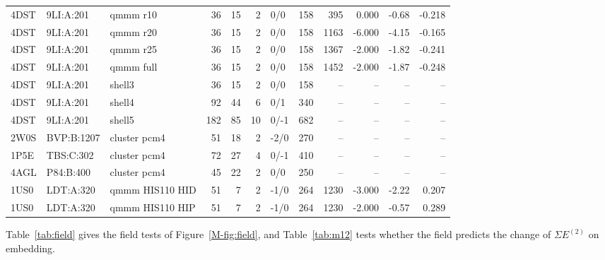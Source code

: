 \documentclass[journal=jcisd8,manuscript=suppinfo]{achemso}
\newcommand{\ET}{E^{(2)}}
\begin{document}
\begin{singlespace}
{\begin{longtable}{lllrrrlrrrrr}
4DST & 9LI:A:201 & qmmm r10 & 36 & 15 & 2 & 0/0 & 158 & 395 & 0.000 & -0.68 & -0.218\\
4DST & 9LI:A:201 & qmmm r20 & 36 & 15 & 2 & 0/0 & 158 & 1163 & -6.000 & -4.15 & -0.165\\
4DST & 9LI:A:201 & qmmm r25 & 36 & 15 & 2 & 0/0 & 158 & 1367 & -2.000 & -1.82 & -0.241\\
4DST & 9LI:A:201 & qmmm full & 36 & 15 & 2 & 0/0 & 158 & 1452 & -2.000 & -1.87 & -0.248\\
4DST & 9LI:A:201 & shell3 & 36 & 15 & 2 & 0/0 & 158 & -- & -- & -- & --\\
4DST & 9LI:A:201 & shell4 & 92 & 44 & 6 & 0/1 & 340 & -- & -- & -- & --\\
4DST & 9LI:A:201 & shell5 & 182 & 85 & 10 & 0/-1 & 682 & -- & -- & -- & --\\
2W0S & BVP:B:1207 & cluster pcm4 & 51 & 18 & 2 & -2/0 & 270 & -- & -- & -- & --\\
1P5E & TBS:C:302 & cluster pcm4 & 72 & 27 & 4 & 0/-1 & 410 & -- & -- & -- & --\\
4AGL & P84:B:400 & cluster pcm4 & 45 & 22 & 2 & 0/0 & 250 & -- & -- & -- & --\\
1US0 & LDT:A:320 & qmmm HIS110 HID & 51 & 7 & 2 & -1/0 & 264 & 1230 & -3.000 & -2.22 & 0.207\\
1US0 & LDT:A:320 & qmmm HIS110 HIP & 51 & 7 & 2 & -1/0 & 264 & 1230 & -2.000 & -0.57 & 0.289\\
\end{longtable}}

Table~\ref{tab:field} gives the field tests of Figure~\ref{M-fig:field}, and Table~\ref{tab:m12} tests whether the field predicts the change of $\Sigma\ET$ on embedding.


\end{singlespace}
\end{document}
